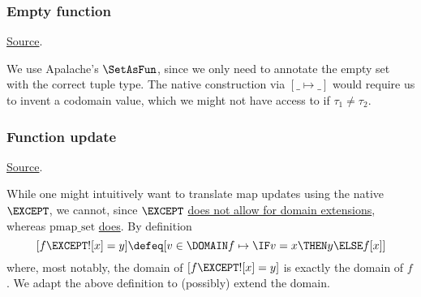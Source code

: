 \subsubsection{ Empty function}
\href{https://github.com/saltiniroberto/ssf/blob/7ea6e18093d9da3154b4e396dd435549f687e6b9/high_level/common/pythonic_code_generic.py#L109-L110}{Source}.



\begin{mathpar}
\end{mathpar}
We use Apalache's $\SetAsFun$, since we only need to annotate the empty set with the correct tuple type. The native construction via $[ \_ \mapsto \_]$ would require us to invent a codomain value, which we might not have access to if $\tau_1 \ne \tau_2$.

\subsubsection{ Function update}
\href{https://github.com/saltiniroberto/ssf/blob/7ea6e18093d9da3154b4e396dd435549f687e6b9/high_level/common/pythonic_code_generic.py#L113-L114}{Source}.



\begin{mathpar}
\end{mathpar}
While one might intuitively want to translate map updates using the \tlap{} native $\EXCEPT$, we cannot, since $\EXCEPT$ \href{https://lamport.azurewebsites.net/tla/book-21-07-04.pdf}{does not allow for domain extensions}, whereas $\mathrm{pmap\_set}$ \href{https://pyrsistent.readthedocs.io/en/latest/api.html#pyrsistent.PMap.set}{does}. By definition
\[
[f \EXCEPT ![x] = y] \defeq [v \in \DOMAIN f \mapsto \IF v = x \THEN y \ELSE f[x] ]
\]
where, most notably, the domain of $[f \EXCEPT ![x] = y]$ is exactly the domain of $f$. We adapt the above definition to (possibly) extend the domain.

